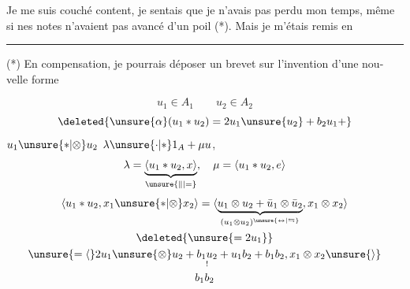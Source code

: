 Je me suis couché content, je sentais que je n'avais pas perdu mon temps, même si nes notes n'avaient pas avancé d'un poil (*). Mais je m'étais remis en
\par\noindent\rule{0.25\linewidth}{0.4pt}
(*) En compensation, je pourrais déposer un brevet sur l'invention d'une nou-\linebreak velle forme 

\[u_1\in A_1\qquad u_2\in A_2\]
  
\[\deleted{\unsure{\alpha}(u_1\ast u_2)=2u_1\unsure{u_2}+b_2u_1+}\]
$u_1\unsure{\ast|\otimes}u_2$  $\lambda\unsure{\cdot|\ast}1_A+\mu u$,  
\[
\lambda=\underbrace{\langle u_1\ast u_2,x\rangle}_{\unsure{\parallel|=}},\quad
\mu=\langle u_1\ast u_2,e\rangle
\]
\[
\begin{gathered}
\langle u_1\ast u_2,x_1\unsure{\ast|\otimes}x_2\rangle
=\langle\underbrace{u_1\otimes u_2+\bar u_1\otimes\bar u_2}_{(u_1\otimes u_2)^{\unsure{\leftrightarrow|\leftrightarrows}}},x_1\otimes x_2\rangle\\
\deleted{\unsure{=2u_1}}\\
\unsure{=\langle}2u_1\unsure{\otimes}u_2+\underset{!}{b_1u_2}+u_1b_2+b_1b_2,x_1\otimes x_2\unsure{\rangle}\\
b_1b_2
\end{gathered}
\]
